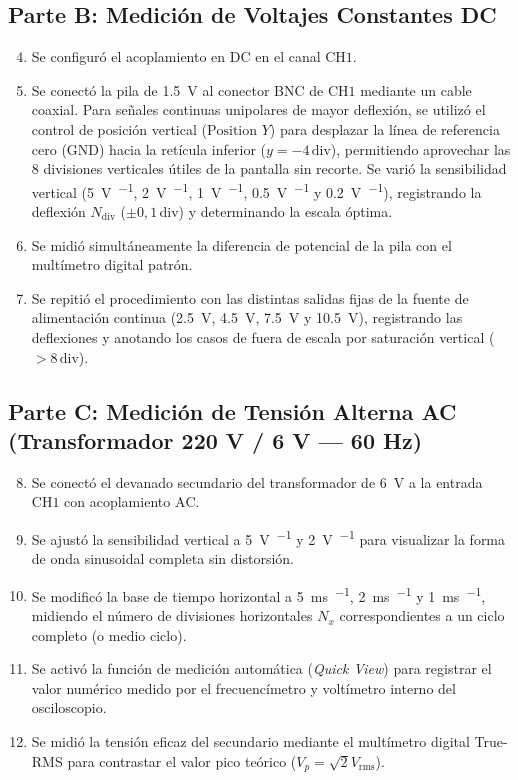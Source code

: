 \subsection{Parte B: Medición de Voltajes Constantes DC}
\begin{enumerate}
    \setcounter{enumi}{3}
    \item Se configuró el acoplamiento en $\text{DC}$ en el canal $\text{CH1}$.
    \item Se conectó la pila de \qty{1,5}{\volt} al conector BNC de $\text{CH1}$ mediante un cable coaxial. Para señales continuas unipolares de mayor deflexión, se utilizó el control de posición vertical ($\text{Position } Y$) para desplazar la línea de referencia cero ($\text{GND}$) hacia la retícula inferior ($y = -4\,\text{div}$), permitiendo aprovechar las 8 divisiones verticales útiles de la pantalla sin recorte. Se varió la sensibilidad vertical (\qty{5}{\volt\per\division}, \qty{2}{\volt\per\division}, \qty{1}{\volt\per\division}, \qty{0,5}{\volt\per\division} y \qty{0,2}{\volt\per\division}), registrando la deflexión $N_{\text{div}}$ ($\pm 0{,}1\,\text{div}$) y determinando la escala óptima.
    \item Se midió simultáneamente la diferencia de potencial de la pila con el multímetro digital patrón.
    \item Se repitió el procedimiento con las distintas salidas fijas de la fuente de alimentación continua (\qty{2,5}{\volt}, \qty{4,5}{\volt}, \qty{7,5}{\volt} y \qty{10,5}{\volt}), registrando las deflexiones y anotando los casos de fuera de escala por saturación vertical ($> 8\,\text{div}$).
\end{enumerate}

\subsection{Parte C: Medición de Tensión Alterna AC (Transformador 220 V / 6 V — 60 Hz)}
\begin{enumerate}
    \setcounter{enumi}{7}
    \item Se conectó el devanado secundario del transformador de \qty{6}{\volt} a la entrada $\text{CH1}$ con acoplamiento $\text{AC}$.
    \item Se ajustó la sensibilidad vertical a \qty{5}{\volt\per\division} y \qty{2}{\volt\per\division} para visualizar la forma de onda sinusoidal completa sin distorsión.
    \item Se modificó la base de tiempo horizontal a \qty{5}{\milli\second\per\division}, \qty{2}{\milli\second\per\division} y \qty{1}{\milli\second\per\division}, midiendo el número de divisiones horizontales $N_x$ correspondientes a un ciclo completo (o medio ciclo).
    \item Se activó la función de medición automática (\textit{Quick View}) para registrar el valor numérico medido por el frecuencímetro y voltímetro interno del osciloscopio.
    \item Se midió la tensión eficaz del secundario mediante el multímetro digital True-RMS para contrastar el valor pico teórico ($V_p = \sqrt{2} V_{\text{rms}}$).
\end{enumerate}

